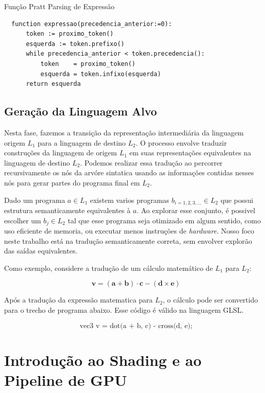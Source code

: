\documentclass[english, 
               brazil, 
               bsc] %
               {dcomp-abntex2}
\begin{document}
\begin{algoritmo}[H]
	\caption{Função Pratt Parsing de Expressão}
	\label{alg1}
  \begin{lstlisting}
  function expressao(precedencia_anterior:=0):
      token := proximo_token()
      esquerda := token.prefixo()
      while precedencia_anterior < token.precedencia():
          token    = proximo_token()
          esquerda = token.infixo(esquerda)
      return esquerda
  \end{lstlisting}
\end{algoritmo}

\subsection{Geração da Linguagem Alvo} \label{codegen}

Nesta fase, fazemos a transição da representação intermediária  da linguagem origem \( L_1 \)  para  a linguagem de destino \( L_2 \). O processo envolve traduzir construções da linguagem de origem \( L_1 \) em suas representações equivalentes na linguagem de destino \( L_2 \). Podemos realizar essa tradução ao percorrer recursivamente os nós da arvóre sintatica usando as informações contidas nesses nós para gerar partes do programa final em $L_2$.

Dado um programa $a \in L_1$ existem varios programas $b_{i=1,2,3,...} \in L_2$ que possui estrutura semanticamente equivalentes à $a$. Ao explorar esse conjunto, é possivel escolher um $b_j \in L_2$ tal que esse programa seja otimizado em algum sentido, como uso eficiente de memoria, ou executar menos instruções de \textit{hardware}. Nosso foco neste trabalho está na tradução semanticamente correta, sem envolver explorão das saídas  equivalentes.

Como exemplo, considere a tradução de um cálculo matemático de \( L_1 \) para \( L_2 \):

\[
 \quad \mathbf{v} = (\mathbf{a} + \mathbf{b}) \cdot \mathbf{c} - (\mathbf{d} \times \mathbf{e})
\]

Após a tradução da expressão matematica para \( L_2 \), o cálculo pode ser convertido para o trecho de programa abaixo. Esse código é válido na linguagem GLSL.

\[
\quad \text{{vec3 v = dot(a + b, c) - cross(d, e);}}
\]


\section{Introdução ao Shading e ao Pipeline de GPU} \label{shading}
\end{document}
